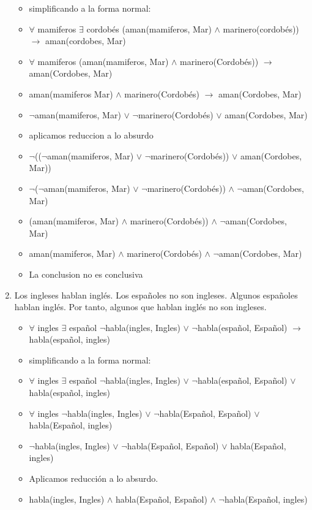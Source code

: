 \documentclass[a4paper,10pt]{article}
\begin{document}
\begin{enumerate}
\begin{itemize}
		\item simplificando a la forma normal:
		\item $\forall$ mamiferos $\exists$ cordobés (aman(mamiferos, Mar) $\land$ marinero(cordobés)) $\rightarrow$ aman(cordobes, Mar)
		\item $\forall$ mamiferos (aman(mamiferos, Mar) $\land$ marinero(Cordobés)) $\rightarrow$ aman(Cordobes, Mar)
		\item aman(mamiferos Mar) $\land$ marinero(Cordobés) $\rightarrow$ aman(Cordobes, Mar)
		\item $\lnot$aman(mamiferos, Mar) $\lor$ $\lnot$marinero(Cordobés) $\lor$ aman(Cordobes, Mar)
		\item aplicamos reduccion a lo absurdo
		\item $\lnot$(($\lnot$aman(mamiferos, Mar) $\lor$ $\lnot$marinero(Cordobés)) $\lor$ aman(Cordobes, Mar))
		\item $\lnot$($\lnot$aman(mamiferos, Mar) $\lor$ $\lnot$marinero(Cordobés)) $\land$ $\lnot$aman(Cordobes, Mar)
		\item (aman(mamiferos, Mar) $\land$ marinero(Cordobés)) $\land$ $\lnot$aman(Cordobes, Mar)
		\item aman(mamiferos, Mar) $\land$ marinero(Cordobés) $\land$ $\lnot$aman(Cordobes, Mar)
		\item La conclusion no es conclusiva
	\end{itemize}
	\item Los ingleses hablan inglés. Los españoles no son ingleses. Algunos españoles hablan inglés. Por tanto, algunos que hablan inglés no son ingleses.
	\begin{itemize}
		\item $\forall$ ingles $\exists$ español $\lnot$habla(ingles, Ingles) $\lor$ $\lnot$habla(español, Español) $\rightarrow$ habla(español, ingles)
		\item simplificando a la forma normal:
		\item $\forall$ ingles $\exists$ español $\lnot$habla(ingles, Ingles) $\lor$ $\lnot$habla(español, Español) $\lor$ habla(español, ingles)
		\item $\forall$ ingles $\lnot$habla(ingles, Ingles) $\lor$ $\lnot$habla(Español, Español) $\lor$ habla(Español, ingles)
		\item $\lnot$habla(ingles, Ingles) $\lor$ $\lnot$habla(Español, Español) $\lor$ habla(Español, ingles)
		\item Aplicamos reducción a lo absurdo.
		\item habla(ingles, Ingles) $\land$ habla(Español, Español) $\land$ $\lnot$habla(Español, ingles)

\end{itemize}
\end{enumerate}
\end{document}
